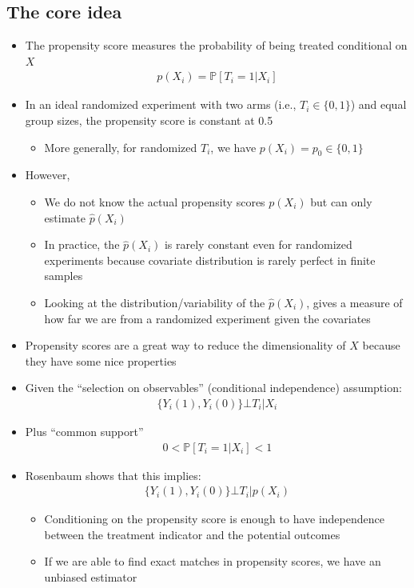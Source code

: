 \documentclass[10pt]{article}
\begin{document}
\subsection{The core idea}
\begin{itemize}
    \item The propensity score measures the probability of being treated conditional on $X $
    \begin{gather*}
        p(X_i) = \mathbb{P}[T_i = 1|X_i]
    \end{gather*}
    \item In an ideal randomized experiment with two arms (i.e., $T_i\in \{0, 1\}$) and equal group sizes, the propensity score is constant at 0.5
    \begin{itemize}
        \item More generally, for randomized $T_i $, we have $p(X_i) = p_0\in \{0, 1\} $
    \end{itemize}
    \item However,
    \begin{itemize}
        \item We do not know the actual propensity scores $p(X_i) $ but can only estimate $\hat{p}(X_i) $
        \item In practice, the $\hat{p}(X_i) $ is rarely constant even for randomized experiments because covariate distribution is rarely perfect in finite samples 
        \item Looking at the distribution/variability of the $\hat{p}(X_i) $, gives a measure of how far we are from a randomized experiment given the covariates 
    \end{itemize}
    \item Propensity scores are a great way to reduce the dimensionality of $X $ because they have some nice properties 
    \item Given the ``selection on observables'' (conditional independence) assumption: 
    \begin{gather*}
        \{Y_i(1), Y_i(0)\} \bot T_i|X_i
    \end{gather*}
    \item Plus ``common support'' 
    \begin{gather*}
        0 < \mathbb{P}[T_i = 1 | X_i] < 1
    \end{gather*}
    \item Rosenbaum shows that this implies:
    \begin{gather*}
        \{Y_i(1), Y_i(0)\} \bot T_i|p(X_i)
    \end{gather*}
    \begin{itemize}
        \item Conditioning on the propensity score is enough to have independence between the treatment indicator and the potential outcomes 
        \item If we are able to find exact matches in propensity scores, we have an unbiased estimator 
    \end{itemize}
\end{itemize}
\newpage 
\end{document}
